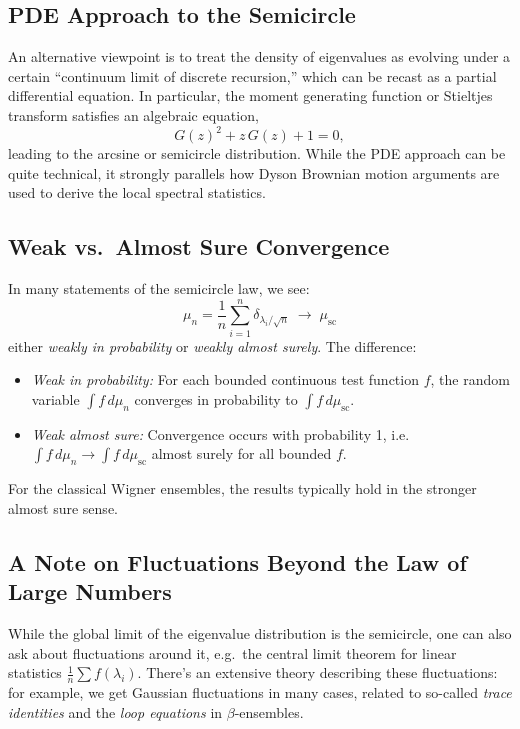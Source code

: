 \documentclass[letterpaper,11pt,oneside,reqno]{article}
\numberwithin{equation}{section}
\theoremstyle{definition}
\begin{document}
\subsection{PDE Approach to the Semicircle}

An alternative viewpoint is to treat the density of eigenvalues as evolving under a certain “continuum limit of discrete recursion,” which can be recast as a partial differential equation. In particular, the moment generating function or Stieltjes transform satisfies an algebraic equation,
\[
  G(z)^2 + z\,G(z)+1=0,
\]
leading to the arcsine or semicircle distribution. While the PDE approach can be quite technical, it strongly parallels how Dyson Brownian motion arguments are used to derive the local spectral statistics.

\subsection{Weak vs.\ Almost Sure Convergence}

In many statements of the semicircle law, we see:
\[
  \mu_n = \frac1n \sum_{i=1}^n \delta_{\lambda_i/\sqrt{n}}
  \;\longrightarrow\;
  \mu_{\mathrm{sc}}
\]
either \emph{weakly in probability} or \emph{weakly almost surely}. The difference:
\begin{itemize}
\item \emph{Weak in probability:} For each bounded continuous test function $f$, the random variable $\int f\,d \mu_n$ converges in probability to $\int f\,d \mu_{\mathrm{sc}}$.
\item \emph{Weak almost sure:} Convergence occurs with probability 1, i.e.\ \(\int f\,d \mu_n \to \int f\,d \mu_{\mathrm{sc}}\) almost surely for all bounded $f$.
\end{itemize}
For the classical Wigner ensembles, the results typically hold in the stronger almost sure sense.

\subsection{A Note on Fluctuations Beyond the Law of Large Numbers}

While the global limit of the eigenvalue distribution is the semicircle, one can also ask about fluctuations around it, e.g.\ the central limit theorem for linear statistics $\frac{1}{n}\sum f(\lambda_i)$. There's an extensive theory describing these fluctuations: for example, we get Gaussian fluctuations in many cases, related to so-called \emph{trace identities} and the \emph{loop equations} in $\beta$-ensembles.
\end{document}
